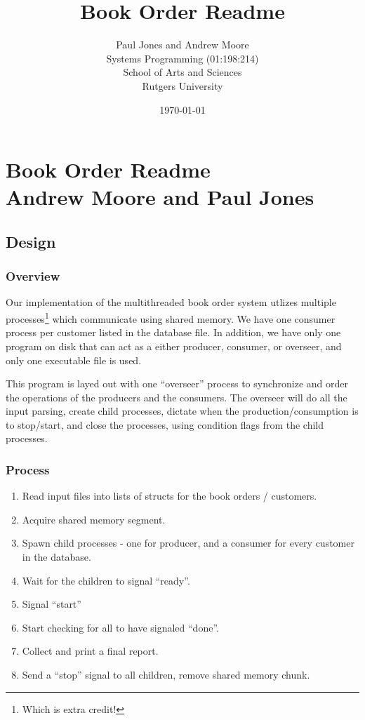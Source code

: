 \documentclass{article}
\title{Book Order  Readme}
\date{\today}
\author{Paul Jones and Andrew Moore \\ Systems Programming (01:198:214) \\ School of Arts and Sciences \\ Rutgers University}
\begin{document}
\section*{Book Order Readme\\Andrew Moore and Paul Jones}

\subsection*{Design}

\subsubsection*{Overview}

Our implementation of the multithreaded book order system utlizes multiple processes\footnote{Which is extra credit!} 
which communicate using shared memory. We have one consumer process per customer listed in the database file. 
In addition, we have only one program on disk that can act as a either producer, consumer, or overseer,
and only one executable file is used.

This program is layed out with one ``overseer'' process to synchronize and order the operations of 
the producers and the consumers. The overseer will do all the input parsing, create child processes, 
dictate when the production/consumption is to stop/start, and close the processes, using condition 
flags from the child processes. 

\subsubsection*{Process}

\begin{enumerate}
\item Read input files into lists of structs for the book orders / customers.
\item Acquire shared memory segment.
\item Spawn child processes - one for producer, and a consumer for every customer in the database.
\item Wait for the children to signal ``ready''.
\item Signal ``start''
\item Start checking for all to have signaled ``done''.
\item Collect and print a final report.
\item Send a ``stop'' signal to all children, remove shared memory chunk.
\end{enumerate}
\end{document}
